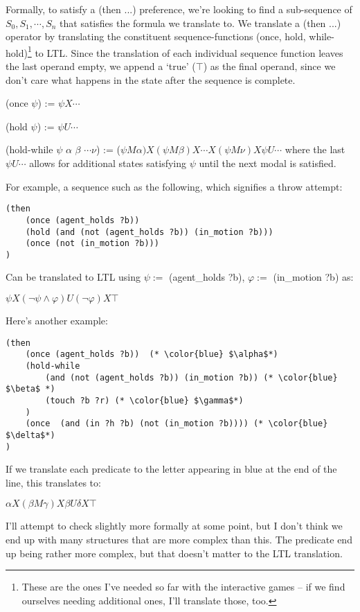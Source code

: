 \documentclass{article}
\begin{document}
Formally, to satisfy a (then ...) preference, we're looking to find a sub-sequence of $S_0, S_1, \cdots, S_n$ that satisfies the formula we translate to. 
We translate a (then ...) operator by translating the constituent sequence-functions (once, hold, while-hold)\footnote{These are the ones I've needed so far with the interactive games -- if we find ourselves needing additional ones, I'll translate those, too.} to LTL. 
Since the translation of each individual sequence function leaves the last operand empty, we append a `true' ($\top$) as the final operand, since we don't care what happens in the state after the sequence is complete. 

(once $\psi$) := $\psi X \cdots$

(hold $\psi$) := $\psi U \cdots$

(hold-while $\psi$ $\alpha$ $\beta$ $\cdots \nu$) := ($\psi M \alpha) X (\psi M \beta) X \cdots X (\psi M \nu) X \psi U \cdots$ where the last $\psi U \cdots$ allows for additional states satisfying $\psi$ until the next modal is satisfied.

For example, a sequence such as the following, which signifies a throw attempt:
\begin{lstlisting}
(then
    (once (agent_holds ?b))
    (hold (and (not (agent_holds ?b)) (in_motion ?b))) 
    (once (not (in_motion ?b)))
)
\end{lstlisting}
Can be translated to LTL using $\psi:=$ (agent_holds ?b), $\varphi:=$ (in_motion ?b) as:

$\psi X (\neg \psi \wedge \varphi) U (\neg \varphi) X \top $

Here's another example: 
\begin{lstlisting}
(then 
    (once (agent_holds ?b))  (* \color{blue} $\alpha$*)
    (hold-while 
        (and (not (agent_holds ?b)) (in_motion ?b)) (* \color{blue} $\beta$ *)
        (touch ?b ?r) (* \color{blue} $\gamma$*)
    ) 
    (once  (and (in ?h ?b) (not (in_motion ?b)))) (* \color{blue} $\delta$*) 
)
\end{lstlisting}
If we translate each predicate to the letter appearing in blue at the end of the line, this translates to:

$\alpha X (\beta M \gamma) X \beta U \delta X \top$

I'll attempt to check slightly more formally at some point, but I don't think we end up with many structures that are more complex than this. 
The predicate end up being rather more complex, but that doesn't matter to the LTL translation.
\end{document}
